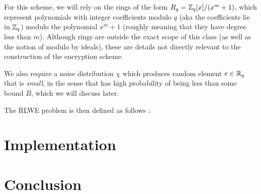 \documentclass{theme}
\begin{document}
For this scheme, we will rely on the rings of the form $R_q = \mathbb{Z}_q[x]/(x^m + 1)$, which represent polynomials with integer coefficients modulo $q$ (aka the coefficients lie in $\mathbb{Z}_q$) modulo the polynomial $x^m + 1$ (roughly meaning that they have degree less than $m$). Although rings are outside the exact scope of this class (as well as the notion of modulo by ideals), these are details not directly relevant to the construction of the encryption scheme.

We also require a noise distribution $\chi$ which produces random element $e \in \mathbb{R}_q$ that is \textit{small}, in the sense that has high probability of being less than some bound $B$, which we will discuss later.

The RLWE problem is then defined as follows :

\section{Implementation}



\section{Conclusion}


\printbibliography
\end{document}
